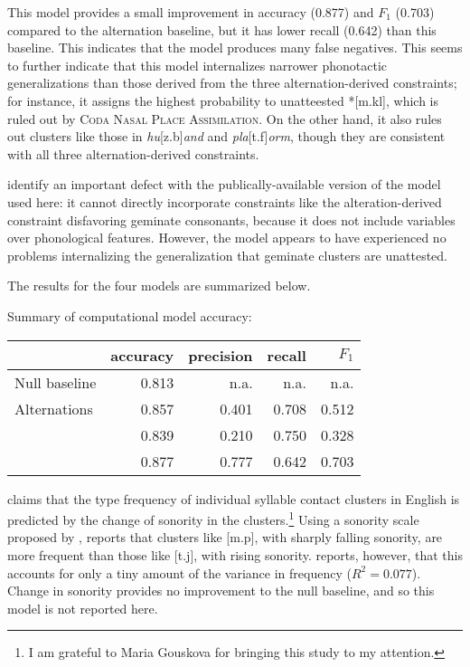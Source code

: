 This model provides a small improvement in accuracy (0.877) and $F_1$ (0.703) compared to the alternation baseline, but it has lower recall (0.642) than this baseline. This indicates that the model produces many false negatives.
This seems to further indicate that this model internalizes narrower phonotactic generalizations than those derived from the three alternation-derived constraints; for instance, it assigns the highest probability to unatteested *[m.kl], which is ruled out by \textsc{Coda Nasal Place Assimilation}. On the other hand, it also rules out clusters like those in \emph{hu}[z.b]\emph{and} and \emph{pla}[t.f]\emph{orm}, though they are consistent with all three alternation-derived constraints. 

\citet{Berent2012} identify an important defect with the publically-available version of the \citeauthor{Hayes2008a} model used here: it cannot directly incorporate constraints like the alteration-derived constraint disfavoring geminate consonants, because it does not include variables over phonological features. However, the model appears to have experienced no problems internalizing the generalization that geminate clusters are unattested. 

The results for the four models are summarized below.

\ex Summary of computational model accuracy: \vspace{6pt} \\
\begin{tabular}{l | r r r r}
\toprule
                          & accuracy & precision & recall & $F_1$ \\ 
\midrule
Null baseline             & 0.813    & n.a.      & n.a.   & n.a.  \\
Alternations              & 0.857    & 0.401     & 0.708  & 0.512 \\
\citet{Pierrehumbert1994} & 0.839    & 0.210     & 0.750  & 0.328 \\
\citet{Hayes2008a}        & 0.877    & 0.777     & 0.642  & 0.703 \\
\bottomrule
\end{tabular}
\xe

\citet{McGowan2011} claims that the type frequency of individual syllable contact clusters in English is predicted by the change of sonority in the clusters.\footnote{I am grateful to Maria Gouskova for bringing this study to my attention.} Using a sonority scale proposed by \citet{Jespersen1904}, \citeauthor{McGowan2011} reports that clusters like [m.p], with sharply falling sonority, are more frequent than those like [t.j], with rising sonority. \citeauthor{McGowan2011} reports, however, that this accounts for only a tiny amount of the variance in frequency ($R^2 = 0.077$). Change in sonority provides no improvement to the null baseline, and so this model is not reported here. 
